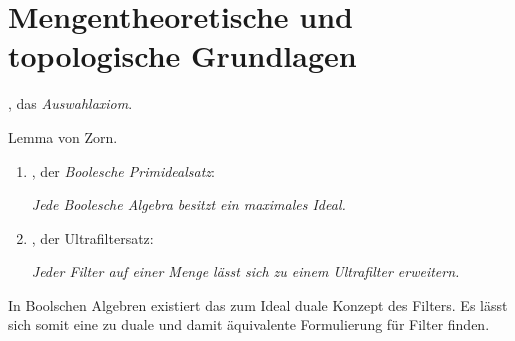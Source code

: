 \chapter{Mengentheoretische und topologische Grundlagen}




\begin{defn}
 \item \AC, das \textit{Auswahlaxiom}.
 \item Lemma von Zorn.
\end{defn}

\begin{defn}
  \begin{enumerate}[(1)]
    \item \PIT, der \textit{Boolesche Primidealsatz}:
      \begin{addmargin}[2em]{2em}%
        \textit{Jede Boolesche Algebra besitzt ein maximales Ideal.}
      \end{addmargin}
    \item \UFT, der Ultrafiltersatz: 
      
      \begin{addmargin}[2em]{2em}%
        \textit{Jeder Filter auf einer Menge lässt sich zu einem Ultrafilter erweitern.}
      \end{addmargin}
  \end{enumerate}
\end{defn}

In Boolschen Algebren existiert das zum Ideal duale Konzept des Filters. Es lässt sich somit eine zu \PIT duale und damit äquivalente Formulierung für Filter finden.

